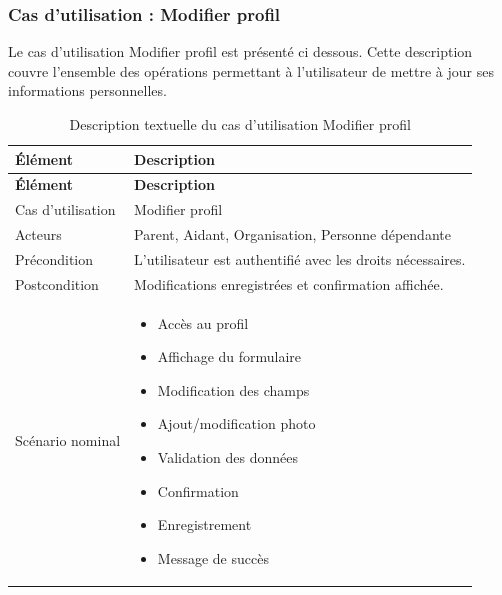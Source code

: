 \subsubsection{Cas d'utilisation : Modifier profil}

Le cas d'utilisation \og Modifier profil \fg{} est présenté ci dessous. Cette description couvre l'ensemble des opérations permettant à l'utilisateur de mettre à jour ses informations personnelles.

\small
\setlength{\tabcolsep}{3pt}
\renewcommand{\arraystretch}{1.05}
\setlength{\parskip}{0pt}

\begin{longtable}{|p{}|p{}|}
\caption{Description textuelle du cas d'utilisation Modifier profil} \\

\hline
\textbf{Élément} & \textbf{Description} \\ \hline
\endfirsthead

\hline
\textbf{Élément} & \textbf{Description} \\ \hline
\endhead

\hline
\endfoot
\hline
\endlastfoot

Cas d'utilisation & Modifier profil \\ \hline

Acteurs & Parent, Aidant, Organisation, Personne dépendante \\ \hline

Précondition & L'utilisateur est authentifié avec les droits nécessaires. \\ \hline

Postcondition & Modifications enregistrées et confirmation affichée. \\ \hline

Scénario nominal &
\vspace{-0.4em}
\begin{itemize}[nosep, topsep=0pt, partopsep=0pt, leftmargin=*]
\item Accès au profil
\item Affichage du formulaire
\item Modification des champs
\item Ajout/modification photo
\item Validation des données
\item Confirmation
\item Enregistrement
\item Message de succès
\end{itemize}
\vspace{-0.6em}
\\ \hline


\end{longtable}
